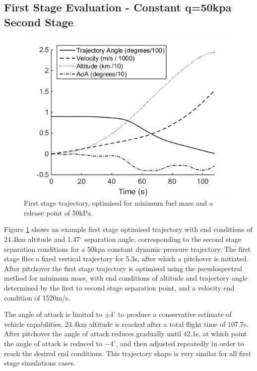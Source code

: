 \documentclass[]{aiaa-tc}
\begin{document}
\subsection{First Stage Evaluation - Constant q=50kpa Second Stage}
\begin{figure}[!ht]
	\centering
	\includegraphics[width=.7\linewidth]{FirstStage}
	\caption{First stage trajectory, optimised for minimum fuel mass and a release point of 50kPa.}
	\label{fig:FirstStage}
\end{figure}
Figure \ref{fig:FirstStage} shows an example first stage optimised trajectory with end conditions of 24.4km altitude and 1.47$^\circ$ separation angle, corresponding to the second stage separation conditions for a 50kpa constant dynamic pressure trajectory. The first stage flies a fixed vertical trajectory for 5.3s, after which a pitchover is initiated. After pitchover the first stage trajectory is optimised using the pseudospectral method for minimum mass, with end conditions of altitude and trajectory angle determined by the first to second stage separation point, and a velocity end condition of 1520m/s. 

The angle of attack is limited to $\pm 4^\circ$ to produce a conservative estimate of vehicle capabilities. 24.4km altitude is reached after a total flight time of 107.7s. After pitchover the angle of attack reduces gradually until 42.1s, at which point the angle of attack is reduced to $-4^\circ$, and then adjusted repeatedly in order to reach the desired end conditions. 
This trajectory shape is very similar for all first stage simulations cases. 
\end{document}
